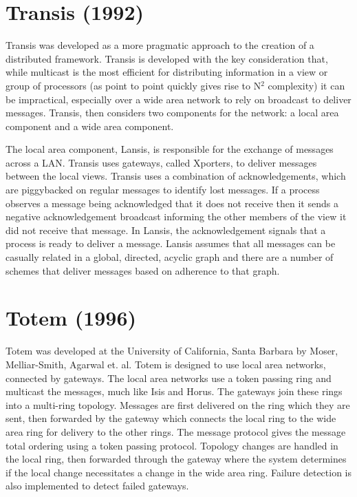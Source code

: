 \section{Transis (1992)}

Transis \cite{TRANSISTOOLKIT} was developed as a more pragmatic approach to the creation of a distributed framework. Transis is developed with the key consideration that, while multicast is the most efficient for distributing information in a view or group of processors (as point to point quickly gives rise to N$^{2}$ complexity) it can be impractical, especially over a wide area network to rely on broadcast to deliver messages. Transis, then considers two components for the network: a local area component and a wide area component.

The local area component, Lansis, is responsible for the exchange of messages across a LAN. Transis uses gateways, called Xporters, to deliver messages between the local views. Transis uses a combination of acknowledgements, which are piggybacked on regular messages to identify lost messages. If a process observes a message being acknowledged that it does not receive then it sends a negative acknowledgement broadcast informing the other members of the view it did not receive that message. In Lansis, the acknowledgement signals that a process is ready to deliver a message. Lansis assumes that all messages can be casually related in a global, directed, acyclic graph and there are a number of schemes that deliver messages based on adherence to that graph.

 

\section{Totem (1996)}

Totem\cite{TOTEMTOOLKIT} was developed at the University of California, Santa Barbara by Moser, Melliar-Smith, Agarwal et. al. Totem is designed to use local area networks, connected by gateways. The local area networks use a token passing ring and multicast the messages, much like Isis and Horus. The gateways join these rings into a multi-ring topology. Messages are first delivered on the ring which they are sent, then forwarded by the gateway which connects the local ring to the wide area ring for delivery to the other rings. The message protocol gives the message total ordering using a token passing protocol. Topology changes are handled in the local ring, then forwarded through the gateway where the system determines if the local change necessitates a change in the wide area ring. Failure detection is also implemented to detect failed gateways.

